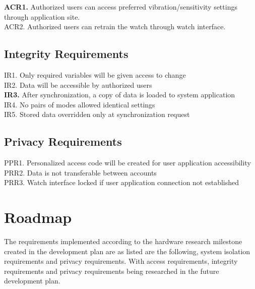 \documentclass{article}
\begin{document}
\textbf{ACR1.} Authorized users can access preferred vibration/sensitivity settings through application site.
\\ACR2. Authorized users can retrain the watch through watch interface. 

\subsection{Integrity Requirements}

IR1. Only required variables will be given access to change
\\IR2. Data will be accessible by authorized users
\\\textbf{IR3.} After synchronization, a copy of data is loaded to system application   
\\IR4. No pairs of modes allowed identical settings
\\IR5. Stored data overridden only at synchronization request

\subsection{Privacy Requirements}

PPR1. Personalized access code will be created for user application accessibility 
\\PRR2. Data is not transferable between accounts
\\PRR3. Watch interface locked if user application connection not established


\section{Roadmap}

The requirements implemented according to the hardware research milestone created in the development plan are as listed are the following, system isolation requirements and privacy requirements. With access requirements, integrity requirements and privacy requirements being researched in the future development plan.
\end{document}
